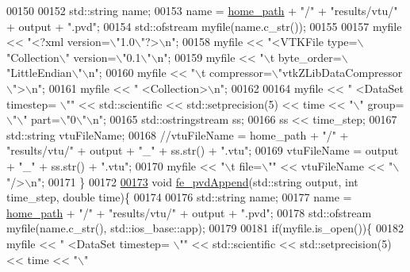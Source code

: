 \begin{DoxyCode}
00150 
00152     std::string name;
00153     name = \hyperlink{_global_variables_8h_a556ce46e457f991c51f3dac111579e2b}{home\_path} + \textcolor{stringliteral}{"/"} + \textcolor{stringliteral}{"results/vtu/"} + output + \textcolor{stringliteral}{".pvd"};
00154     std::ofstream myfile(name.c\_str());
00155 
00157     myfile << \textcolor{stringliteral}{"<?xml version=\(\backslash\)"1.0\(\backslash\)"?>\(\backslash\)n"};
00158     myfile << \textcolor{stringliteral}{"<VTKFile type=\(\backslash\)"Collection\(\backslash\)" version=\(\backslash\)"0.1\(\backslash\)"\(\backslash\)n"};
00159     myfile << \textcolor{stringliteral}{"\(\backslash\)t byte\_order=\(\backslash\)"LittleEndian\(\backslash\)"\(\backslash\)n"};
00160     myfile << \textcolor{stringliteral}{"\(\backslash\)t compressor=\(\backslash\)"vtkZLibDataCompressor\(\backslash\)">\(\backslash\)n"};
00161     myfile << \textcolor{stringliteral}{"   <Collection>\(\backslash\)n"};
00162 
00164     myfile << \textcolor{stringliteral}{"     <DataSet timestep= \(\backslash\)""} << std::scientific << std::setprecision(5) << time << \textcolor{stringliteral}{"\(\backslash\)" group=
      \(\backslash\)"\(\backslash\)" part=\(\backslash\)"0\(\backslash\)"\(\backslash\)n"};
00165     std::ostringstream ss;
00166     ss << time\_step;
00167     std::string vtuFileName;
00168     \textcolor{comment}{//vtuFileName = home\_path + "/" + "results/vtu/" + output + "\_" + ss.str() + ".vtu";}
00169     vtuFileName = output + \textcolor{stringliteral}{"\_"} + ss.str() + \textcolor{stringliteral}{".vtu"};
00170     myfile << \textcolor{stringliteral}{"\(\backslash\)t      file=\(\backslash\)""} << vtuFileName << \textcolor{stringliteral}{"\(\backslash\)"/>\(\backslash\)n"};
00171 \}
00172 
\hyperlink{fe__vtu_8cpp_ab350b9dfb65474874d79a92f712078a0}{00173} \textcolor{keywordtype}{void} \hyperlink{fe__vtu_8cpp_ab350b9dfb65474874d79a92f712078a0}{fe\_pvdAppend}(std::string output, \textcolor{keywordtype}{int} time\_step, \textcolor{keywordtype}{double} time)\{
00174 
00176     std::string name;
00177     name = \hyperlink{_global_variables_8h_a556ce46e457f991c51f3dac111579e2b}{home\_path} + \textcolor{stringliteral}{"/"} + \textcolor{stringliteral}{"results/vtu/"} + output + \textcolor{stringliteral}{".pvd"};
00178     std::ofstream myfile(name.c\_str(), std::ios\_base::app);
00179 
00181     \textcolor{keywordflow}{if}(myfile.is\_open())\{
00182         myfile << \textcolor{stringliteral}{"     <DataSet timestep= \(\backslash\)""} << std::scientific << std::setprecision(5) << time << \textcolor{stringliteral}{"\(\backslash\)"
}
\end{DoxyCode}

